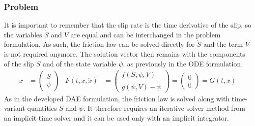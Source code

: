 \subsubsection{Problem}
It is important to remember that the slip rate is the time derivative of the slip, so the variables $\dot{S}$ and $V$ are equal and can be interchanged in the problem formulation. As such, the friction law can be solved directly for $\dot{S}$ and the term $V$ is not required anymore. The solution vector then remains with the components of the slip $S$ and of the state variable $\psi$, as previously in the ODE formulation.
 \begin{align}
	\label{eq:DAE_compact_formulation_SEAS}
	x &= \begin{pmatrix}
			S \\ \psi
	     \end{pmatrix} & F(t, x,\dot{x}) &= \begin{pmatrix}
												f(S,\psi,V) \\ g(\psi, V) - \dot{\psi}
											\end{pmatrix} = \begin{pmatrix}
																0 \\ 0
															\end{pmatrix} = G(t,x)
\end{align}
As in the developed DAE formulation, the friction law is solved along with time-variant quantities $S$ and $\psi$. It therefore requires an iterative solver method from an implicit time solver and it can be used only with an implicit integrator. \\

